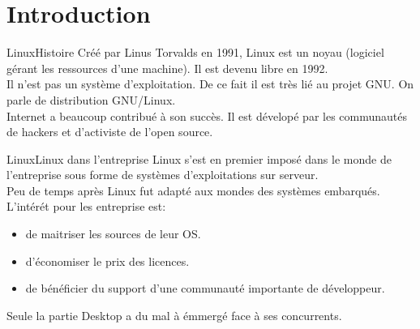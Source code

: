 \section{Introduction}

\begin{frame}{Linux}{Histoire}
	Créé par Linus Torvalds en 1991, Linux est un noyau (logiciel gérant les ressources d'une machine). Il est devenu libre en 1992.\\
	Il n'est pas un système d'exploitation. De ce fait il est très lié au projet GNU. On parle de distribution GNU/Linux.\\
	Internet a beaucoup contribué à son succès. Il est dévelopé par les communautés de hackers et d'activiste de l'open source.\\
\end{frame}

\begin{frame}{Linux}{Linux dans l'entreprise}
	Linux s'est en premier imposé dans le monde de l'entreprise sous forme de systèmes d'exploitations sur serveur.\\
	Peu de temps après Linux fut adapté aux mondes des systèmes embarqués.\\
	L'intérét pour les entreprise est:
	\begin{itemize}
		\item
			de maitriser les sources de leur OS.\\
		\item
			d'économiser le prix des licences.\\
		\item
			de bénéficier du support d'une communauté importante de développeur.\\
	\end{itemize}
	Seule la partie Desktop a du mal à émmergé face à ses concurrents.\\
\end{frame}